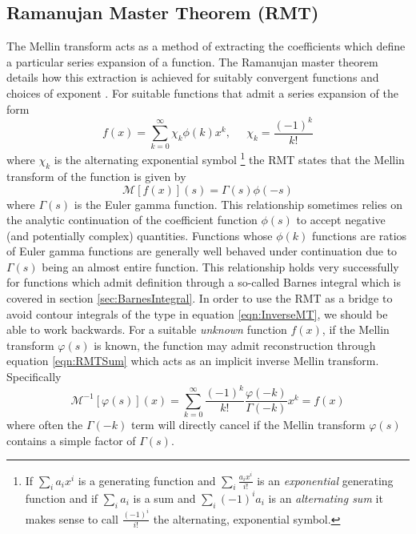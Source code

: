 \documentclass[journal=jcisd8,manuscript=article,layout=onecolumn,pdftex,floatfix,amsmath,amssymb,10pt]{achemso}
\begin{document}
\subsection{Ramanujan Master Theorem (RMT)}
The Mellin transform acts as a method of extracting the coefficients which define a particular series expansion of a function. The Ramanujan master theorem details how this extraction is achieved for suitably convergent functions and choices of exponent \cite{}. For suitable functions that admit a series expansion of the form
\begin{equation}
f(x) = \sum_{k=0}^\infty \chi_k \phi(k)x^k, \;\;\;\;\; \chi_k = \frac{(-1)^k}{k!}
\label{eqn:RMTSum}
\end{equation}
where $\chi_k$ is the alternating exponential symbol \footnote{If $\sum_i a_ix^i$ is a generating function and $\sum_i \frac{a_ix^i}{i!}$ is an \emph{exponential} generating function and if $\sum_{i} a_i$ is a sum and $\sum_i (-1)^i a_i$ is an \emph{alternating sum} it makes sense to call $\frac{(-1)^i}{i!}$ the alternating, exponential symbol.} the RMT states that the Mellin transform of the function is given by
\begin{equation}
\mathcal{M}[f(x)](s) = \Gamma(s)\phi(-s)
\end{equation}
where $\Gamma(s)$ is the Euler gamma function. This relationship sometimes relies on the analytic continuation of the coefficient function $\phi(s)$ to accept negative (and potentially complex) quantities. Functions whose $\phi(k)$ functions are ratios of Euler gamma functions are generally well behaved under continuation due to $\Gamma(s)$ being an almost entire function. This relationship holds very successfully for functions which admit definition through a so-called Barnes integral which is covered in section \ref{sec:BarnesIntegral}. In order to use the RMT as a bridge to avoid contour integrals of the type in equation \ref{eqn:InverseMT}, we should be able to work backwards. For a suitable \emph{unknown} function $f(x)$, if the Mellin transform $\varphi(s)$ is known, the function may admit reconstruction through equation \ref{eqn:RMTSum} which acts as an implicit inverse Mellin transform. Specifically
\begin{equation}
\mathcal{M}^{-1}[\varphi(s)](x) = \sum_{k=0}^\infty \frac{(-1)^k}{k!}\frac{\varphi(-k)}{\Gamma(-k)}x^k = f(x)
\label{eqn:ImplicitInverseMellin}
\end{equation}
where often the $\Gamma(-k)$ term will directly cancel if the Mellin transform $\varphi(s)$ contains a simple factor of $\Gamma(s)$.
\end{document}
